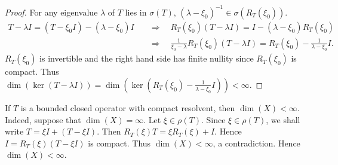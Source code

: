 \begin{proof}
    For any eigenvalue $\lambda$ of $T$ lies in $\sigma(T)$, 
    $(\lambda - \xi_0)^{-1}\in\sigma(R_T(\xi_0))$. 
    \begin{equation*}
        \begin{split}
            T-\lambda I = (T - \xi_0 I) - (\lambda - \xi_0)I 
            &\quad\Rightarrow\quad 
            R_T(\xi_0)(T-\lambda I) = I - (\lambda - \xi_0)R_T(\xi_0) \\
            &\quad\Rightarrow\quad
            \frac{1}{\xi_0 - \lambda}R_T(\xi_0)(T-\lambda I) = R_T(\xi_0) - \frac{1}{\lambda - \xi_0}I.
        \end{split}
    \end{equation*}
    $R_T(\xi_0)$ is invertible and the right hand side has finite nullity 
    since $R_T(\xi_0)$ is compact. Thus $\dim(\ker(T-\lambda I)) 
    = \dim(\ker(R_T(\xi_0) - \frac{1}{\lambda - \xi_0}I)) < \infty$. 
\end{proof}
\begin{remark}
    If $T$ is a bounded closed operator with compact resolvent, 
    then $\dim(X) < \infty$. Indeed, suppose that $\dim(X) = \infty$. 
    Let $\xi\in\rho(T)$. Since $\xi\in\rho(T)$, we shall write 
    $T = \xi I + (T-\xi I)$. Then $R_T(\xi)T = \xi R_T(\xi) + I$. 
    Hence $I = R_T(\xi)(T-\xi I)$ is compact. Thus $\dim(X) < \infty$, 
    a contradiction. Hence $\dim(X) < \infty$.
\end{remark}

